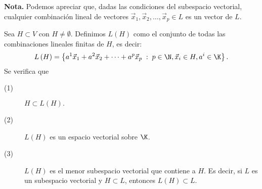 \textbf{Nota.} Podemos apreciar que, dadas las condiciones del subespacio vectorial, cualquier combinación lineal de vectores $\displaystyle \vec{x}_{1}, \vec{x}_{2}, \ldots, \vec{x}_{p}\in L $ es un vector de $\displaystyle L $.

\begin{ftheorem}[]
\normalfont Sea $\displaystyle H \subset V $ con $\displaystyle H \neq \emptyset $. Definimos $\displaystyle L\left(H\right) $  como el conjunto de todas las combinaciones lineales finitas de $\displaystyle H $, es decir:
\[L\left(H\right) = \left\{  a^{1}\vec{x}_{1} + a^{2}\vec{x}_{2} + \cdots + a^{p}\vec{x}_{p}\; : \; p \in \N, \vec{x}_{i}\in H, a^{i} \in \K\right\}  .\]
Se verifica que 
\begin{description}
\item[(1)] $\displaystyle H \subset L\left(H\right). $ 
\item[(2)] $\displaystyle L\left(H\right) $ es un espacio vectorial sobre $\displaystyle \K $. 
\item[(3)] $\displaystyle L\left(H\right) $ es el menor subespacio vectorial que contiene a $\displaystyle H $. Es decir, si $\displaystyle L $ es un subespacio vectorial y $\displaystyle H \subset L $, entonces $\displaystyle L\left(H\right) \subset L $.
\end{description}
\end{ftheorem}


